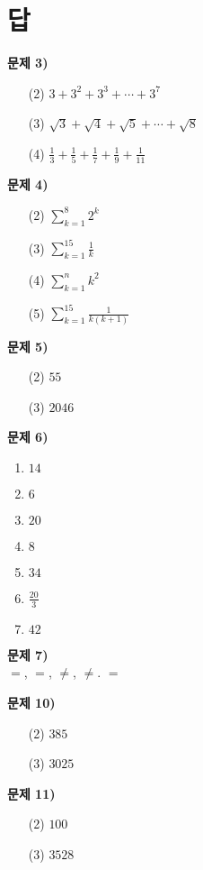 \documentclass{oblivoir}
\newcounter{num}
\newcommand\an[1]{\par\bigskip\noindent\textbf{문제 #1)}\\}
\newcommand\summ[4]{\ensuremath{\displaystyle\sum_{#1=#2}^{#3}#4}}
\let\oldsection\section
\renewcommand\section{\clearpage\oldsection}
\begin{document}
\section*{답}
\begin{minipage}{0.49\textwidth}
%
\an{3}
\begin{enumerate}[topsep=0pt]
\item[(2)]
\(3+3^2+3^3+\cdots+3^7\)
\item[(3)]
\(\sqrt3+\sqrt4+\sqrt5+\cdots+\sqrt8\)
\item[(4)]
\(\frac13+\frac15+\frac17+\frac19+\frac1{11}\)
\end{enumerate}

%
\an{4}
\begin{enumerate}[topsep=0pt]
\item[(2)]
\summ k18{2^k}
\item[(3)]
\summ k1{15}{\frac1k}
\item[(4)]
\summ k1n{k^2}
\item[(5)]
\summ k1{15}{\frac1{k(k+1)}}
\end{enumerate}

%
\an{5}
\begin{enumerate}[topsep=0pt]
\item[(2)]
\(55\)
\item[(3)]
\(2046\)
\end{enumerate}
\end{minipage}
\begin{minipage}{0.49\textwidth}

%
\an{6}
\begin{enumerate}[topsep=0pt]
\item
\(14\)
\item
\(6\)
\item
\(20\)
\item
\(8\)
\item
\(34\)
\item
\(\frac{20}3\)
\item
\(42\)
\end{enumerate}

%
\an{7}
\(=\), \(=\), \(\neq\), \(\neq\). \(=\)

%
\an{10}
\begin{enumerate}
\item[(2)]
\(385\)
\item[(3)]
\(3025\)
\end{enumerate}

%
\an{11}
\begin{enumerate}
\item[(2)]
\(100\)
\item[(3)]
\(3528\)
\end{enumerate}

\end{minipage}
\end{document}
